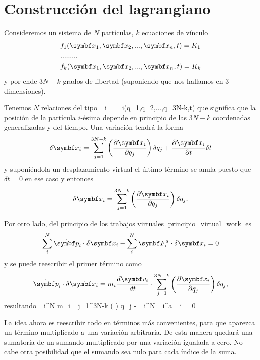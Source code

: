 \documentclass[10pt,oneside]{CBFT_book}
\begin{document}
\section{Construcción del lagrangiano}

Consideremos un sistema de $N$ partículas, $k$ ecuaciones de vínculo 
\begin{eqnarray*}
	& f_1(\vb{x}_1, \vb{x}_2,...,\vb{x}_n,t) = K_1  \\ 
	& ... ... ... \\
	& f_k(\vb{x}_1, \vb{x}_2,...,\vb{x}_n,t) = K_k 
\end{eqnarray*}
y por ende $3N-k$ grados de libertad (suponiendo que nos hallamos en 3 dimensiones).

Tenemos $N$ relaciones del tipo 
\be
	_i = _i(q_1,q_2,...,q_{3N-k},t)
	\label{x_part}
\ee
que significa que la posición de la partícula $i$-ésima depende en principio de las $3N-k$ coordenadas
generalizadas y del tiempo. Una variación tendrá la forma
\[
	\delta \vb{x}_i =  \sum_{j=1}^{3N-k} \left( \dpar{\vb{x}_i}{q_j} \right) \delta q_j + 
	\dpar{\vb{x}_i}{t}\delta t
\]
y suponiéndola un desplazamiento virtual el último término se anula puesto que $\delta t=0$ en ese
caso y entonces
\[
	\delta \vb{x}_i =  \sum_{j=1}^{3N-k} \left( \dpar{\vb{x}_i}{q_j} \right) \delta q_j.
\]

Por otro lado, del principio de los trabajos virtuales \eqref{principio_virtual_work} es
\[
	\sum_i^N \dot{\vb{p}}_i \cdot \delta \vb{x}_i - \sum_i^N  \vb{F}_i^a \cdot \delta \vb{x}_i = 0
\]
y se puede reescribir el primer término como
\[
	\dot{\vb{p}}_i \cdot \delta \vb{x}_i = m_i \dtot{\vb{v}_i}{t} \cdot \sum_{j=1}^{3N-k} 
	\left( \dpar{\vb{x}_i}{q_j} \right) \delta q_j,
\]
resultando
\be
	\sum_i^N m_i  \cdot \sum_{j=1}^{3N-k} \left(  \right)
	\delta q_j - \sum_i^N  _i^a \cdot \delta {}_i = 0
	\label{virtual_work_2}
\ee

La idea ahora es reescribir todo en términos más convenientes, para que aparezca un término multiplicado
a una variación arbitraria. De esta manera quedará una sumatoria de un sumando multiplicado por una
variación igualada a cero. No cabe otra posibilidad que el sumando sea nulo para cada índice de la suma.
\end{document}
